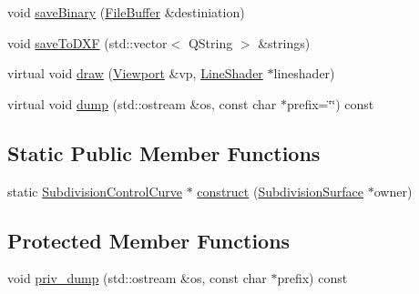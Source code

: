 \begin{DoxyCompactItemize}
\item 
void \hyperlink{classShipCADGeometry_1_1SubdivisionControlCurve_a3ef4c7ce3e2d9a2fe4f90ebf35ffc033}{save\-Binary} (\hyperlink{classShipCADGeometry_1_1FileBuffer}{File\-Buffer} \&destiniation)
\item 
void \hyperlink{classShipCADGeometry_1_1SubdivisionControlCurve_a22726dc4edf385c5b4b5fead84d4c3de}{save\-To\-D\-X\-F} (std\-::vector$<$ Q\-String $>$ \&strings)
\item 
virtual void \hyperlink{classShipCADGeometry_1_1SubdivisionControlCurve_a4d7d8e87dc582529e763039ffe593360}{draw} (\hyperlink{classShipCADGeometry_1_1Viewport}{Viewport} \&vp, \hyperlink{classShipCADGeometry_1_1LineShader}{Line\-Shader} $\ast$lineshader)
\item 
virtual void \hyperlink{classShipCADGeometry_1_1SubdivisionControlCurve_a30e8d074583a386be2ab6343cb5f8502}{dump} (std\-::ostream \&os, const char $\ast$prefix=\char`\"{}\char`\"{}) const 
\end{DoxyCompactItemize}
\subsection*{Static Public Member Functions}
\begin{DoxyCompactItemize}
\item 
static \hyperlink{classShipCADGeometry_1_1SubdivisionControlCurve}{Subdivision\-Control\-Curve} $\ast$ \hyperlink{classShipCADGeometry_1_1SubdivisionControlCurve_a21d9226cc2fd7efcaf6f1067912a0b34}{construct} (\hyperlink{classShipCADGeometry_1_1SubdivisionSurface}{Subdivision\-Surface} $\ast$owner)
\end{DoxyCompactItemize}
\subsection*{Protected Member Functions}
\begin{DoxyCompactItemize}
\item 
void \hyperlink{classShipCADGeometry_1_1SubdivisionControlCurve_a48fbb761e8c85120ba7f6876d873e898}{priv\-\_\-dump} (std\-::ostream \&os, const char $\ast$prefix) const 
\end{DoxyCompactItemize}
